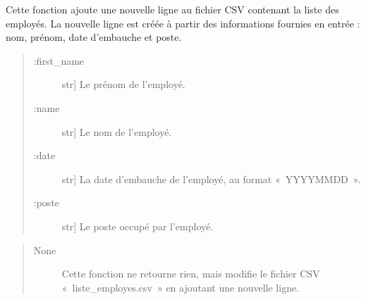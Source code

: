 \documentclass[letterpaper,10pt,french]{sphinxmanual}
\begin{document}
\begin{fulllineitems}
\end{fulllineitems}


\begin{fulllineitems}
\label{\detokenize{formulaire_comment_xe9:formulaire_commente.write_line_in_csv}}
\sphinxAtStartPar
Cette fonction ajoute une nouvelle ligne au fichier CSV contenant la liste des employés.
La nouvelle ligne est créée à partir des informations fournies en entrée : nom, prénom, date d’embauche et poste.
\begin{quote}
\begin{description}
\item[{:first\_name}] \leavevmode{[}str{]}
\sphinxAtStartPar
Le prénom de l’employé.

\item[{:name}] \leavevmode{[}str{]}
\sphinxAtStartPar
Le nom de l’employé.

\item[{:date}] \leavevmode{[}str{]}
\sphinxAtStartPar
La date d’embauche de l’employé, au format « YYYY\sphinxhyphen{}MM\sphinxhyphen{}DD ».

\item[{:poste}] \leavevmode{[}str{]}
\sphinxAtStartPar
Le poste occupé par l’employé.

\end{description}
\end{quote}
\begin{quote}
\begin{description}
\item[{None}] \leavevmode
\sphinxAtStartPar
Cette fonction ne retourne rien, mais modifie le fichier CSV « liste\_employes.csv » en ajoutant une nouvelle ligne.

\end{description}
\end{quote}

\begin{sphinxVerbatim}[commandchars=\\\{\}]
   
\end{sphinxVerbatim}

\end{fulllineitems}
\end{document}
